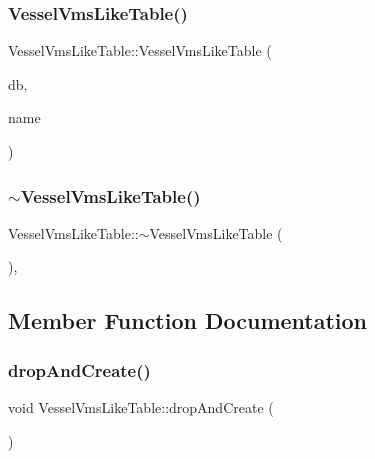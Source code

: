 \subsubsection{\texorpdfstring{VesselVmsLikeTable()}{VesselVmsLikeTable()}}
{\footnotesize\ttfamily Vessel\+Vms\+Like\+Table\+::\+Vessel\+Vms\+Like\+Table (\begin{DoxyParamCaption}\item[{std\+::shared\+\_\+ptr$<$ sqlite\+::\+S\+Q\+Lite\+Storage $>$}]{db,  }\item[{std\+::string}]{name }\end{DoxyParamCaption})}

\mbox{\label{class_vessel_vms_like_table_abf78b3eccdad9fa3a4e0edd31fc00ae9}} 
\subsubsection{\texorpdfstring{$\sim$VesselVmsLikeTable()}{~VesselVmsLikeTable()}}
{\footnotesize\ttfamily Vessel\+Vms\+Like\+Table\+::$\sim$\+Vessel\+Vms\+Like\+Table (\begin{DoxyParamCaption}{ }\end{DoxyParamCaption})\hspace{0.3cm}{\ttfamily [default]}, {\ttfamily [noexcept]}}



\subsection{Member Function Documentation}
\mbox{\label{class_vessel_vms_like_table_ad4a64a0e314cb13e2efbe2678138550d}} 
\subsubsection{\texorpdfstring{dropAndCreate()}{dropAndCreate()}}
{\footnotesize\ttfamily void Vessel\+Vms\+Like\+Table\+::drop\+And\+Create (\begin{DoxyParamCaption}{ }\end{DoxyParamCaption})}

